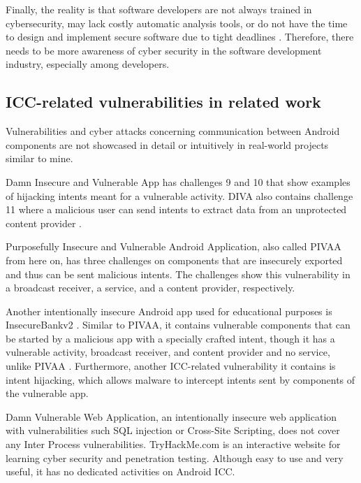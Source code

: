 		Finally, the reality is that software developers are not always trained in cybersecurity, may lack costly automatic analysis tools, or do not have the time to design and implement secure software due to tight deadlines \cite{malwarebytes_blog}. Therefore, there needs to be more awareness of cyber security in the software development industry, especially among developers.
		
		\subsection{ICC-related vulnerabilities in related work}
		    \label{subsec:ICC_related_work}
		
		Vulnerabilities and cyber attacks concerning communication between Android components are not showcased in detail or intuitively in real-world projects similar to mine.
		
		Damn Insecure and Vulnerable App has challenges 9 and 10 that show examples of hijacking intents meant for a vulnerable activity. DIVA also contains challenge 11 where a malicious user can send intents to extract data from an unprotected content provider \cite{diva_walkthrough}. 
		
		Purposefully Insecure and Vulnerable Android Application, also called PIVAA from here on, has three challenges on components that are insecurely exported and thus can be sent malicious intents. The challenges show this vulnerability in a broadcast receiver, a service, and a content provider, respectively.
		
		Another intentionally insecure Android app used for educational purposes is InsecureBankv2 \cite{android_insecure_bank_github}. Similar to PIVAA, it contains vulnerable components that can be started by a malicious app with a specially crafted intent, though it has a vulnerable activity, broadcast receiver, and content provider and no service, unlike PIVAA \cite{android_insecure_bank_walkthrough}. Furthermore, another ICC-related vulnerability it contains is intent hijacking, which allows malware to intercept intents sent by components of the vulnerable app.
		
		Damn Vulnerable Web Application, an intentionally insecure web application with vulnerabilities such SQL injection or Cross-Site Scripting, does not cover any Inter Process vulnerabilities. TryHackMe.com is an interactive website for learning cyber security and penetration testing. Although easy to use and very useful, it has no dedicated activities on Android ICC.
		
